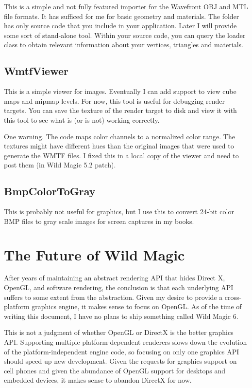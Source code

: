 \documentclass{article}
\begin{document}
This is a simple and not fully featured importer for the Wavefront
OBJ and MTL file formats.  It has sufficed for me for basic geometry
and materials.  The folder has only source code that you include in
your application.  Later I will provide some sort of stand-alone tool.
Within your source code, you can query the loader class to obtain
relevant information about your vertices, triangles and materials.

\subsection{WmtfViewer}

This is a simple viewer for  images.  Eventually I can
add support to view cube maps and mipmap levels.  For now, this tool is
useful for debugging render targets.  You can save the texture of the
render target to disk and view it with this tool to see what is (or is
not) working correctly.

One warning.  The code maps color channels to a normalized color range.
The textures might have different hues than the original images that
were used to generate the WMTF files.  I fixed this in a local copy
of the viewer and need to post them (in Wild Magic 5.2 patch).

\subsection{BmpColorToGray}

This is probably not useful for graphics, but I use this to convert 24-bit
color BMP files to gray scale images for screen captures in my books.

\section{The Future of Wild Magic}

After years of maintaining an abstract rendering API that hides Direct X,
OpenGL, and software rendering, the conclusion is that each underlying API
suffers to some extent from the abstraction.  Given my desire to provide
a cross-platform graphics engine, it makes sense to focus on OpenGL.  As of
the time of writing this document, I have no plans to ship something called
Wild Magic 6.

This is not a judgment of whether OpenGL or DirectX is the better graphics
API.  Supporting multiple platform-dependent renderers slows down the
evolution of the platform-independent engine code, so focusing on only
one graphics API should speed up new development.  Given the requests for
graphics support on cell phones and given the abundance of OpenGL support for
desktops and embedded devices, it makes sense to abandon DirectX for now.
\end{document}
